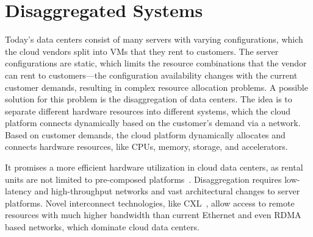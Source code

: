 %
%
%
%
%
%
%


\section{Disaggregated Systems}

Today's data centers consist of many servers with varying configurations, which the cloud vendors split into \acp{VM} that they rent to customers. The server configurations are static, which limits the resource combinations that the vendor can rent to customers—the configuration availability changes with the current customer demands, resulting in complex resource allocation problems. A possible solution for this problem is the disaggregation of data centers. The idea is to separate different hardware resources into different systems, which the cloud platform connects dynamically based on the customer's demand via a network. Based on customer demands, the cloud platform dynamically allocates and connects hardware resources, like \acp{CPU}, memory, storage, and accelerators.

It promises a more efficient hardware utilization in cloud data centers, as rental units are not limited to pre-composed platforms~\cite {intelIntelRackScale2014}. Disaggregation requires low-latency and high-throughput networks and vast architectural changes to server platforms. Novel interconnect technologies, like \ac{CXL}~\cite{vandorenAbstractHOTI20192019}, allow access to remote resources with much higher bandwidth than current Ethernet and even \ac{RDMA} based networks, which dominate cloud data centers.

